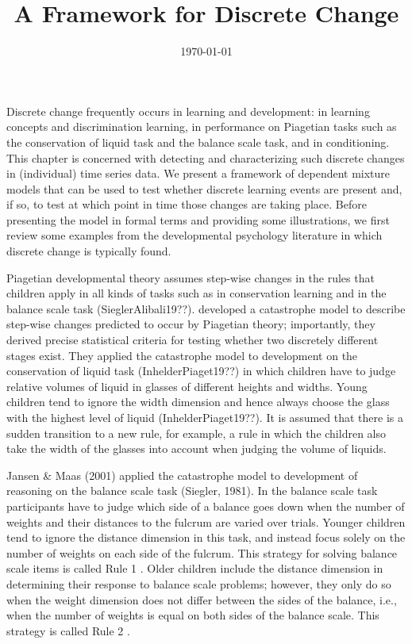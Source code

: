 \documentclass[a4paper,12pt,man]{apa} %
\title{A Framework for Discrete Change}
\date{\today}
\newcommand{\citet}{\citeA}
\begin{document}
\maketitle

Discrete change frequently occurs in learning and development: in
learning concepts and discrimination learning, in performance on
Piagetian tasks such as the conservation of liquid task and the
balance scale task, and in conditioning.  This chapter is concerned
with detecting and characterizing such discrete changes in
(individual) time series data.  We present a framework of dependent
mixture models that can be used to test whether discrete learning
events are present and, if so, to test at which point in time those
changes are taking place.  Before presenting the model in formal terms
and providing some illustrations, we first review some examples from
the developmental psychology literature in which discrete change is
typically found.

Piagetian developmental theory assumes step-wise changes in the rules
that children apply in all kinds of tasks such as in conservation
learning and in the balance scale task (SieglerAlibali19??).
\citet{Maas1992} developed a catastrophe model to describe step-wise
changes predicted to occur by Piagetian theory; importantly, they
derived precise statistical criteria for testing whether two
discretely different stages exist.  They applied the catastrophe model
to development on the conservation of liquid task (InhelderPiaget19??)
in which children have to judge relative volumes of liquid in glasses
of different heights and widths.  Young children tend to ignore the
width dimension and hence always choose the glass with the highest
level of liquid (InhelderPiaget19??).  It is assumed that there is a
sudden transition to a new rule, for example, a rule in which the
children also take the width of the glasses into account when judging
the volume of liquids.


Jansen \& Maas (2001) applied the catastrophe model to
development of reasoning on the balance scale task (Siegler, 1981).
In the balance scale task participants have to judge which side of a
balance goes down when the number of weights and their distances to
the fulcrum are varied over trials.  Younger children tend to ignore
the distance dimension in this task, and instead focus solely on the
number of weights on each side of the fulcrum.  This strategy for
solving balance scale items is called Rule 1 \citet{Siegler1981}.  Older
children include the distance dimension in determining their response
to balance scale problems; however, they only do so when the weight
dimension does not differ between the sides of the balance, i.e., when
the number of weights is equal on both sides of the balance scale.
This strategy is called Rule 2 \cite{Siegler1981}.
\end{document}
